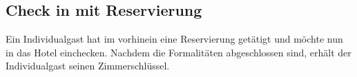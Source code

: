 \documentclass[../SubfileFeatures.tex]{subfiles}
\begin{document}
    \subsection{Check in mit Reservierung}
    Ein Individualgast hat im vorhinein eine Reservierung getätigt und möchte nun in das Hotel einchecken.
    Nachdem die Formalitäten abgeschlossen sind, erhält der Individualgast seinen Zimmerschlüssel.
\end{document}
